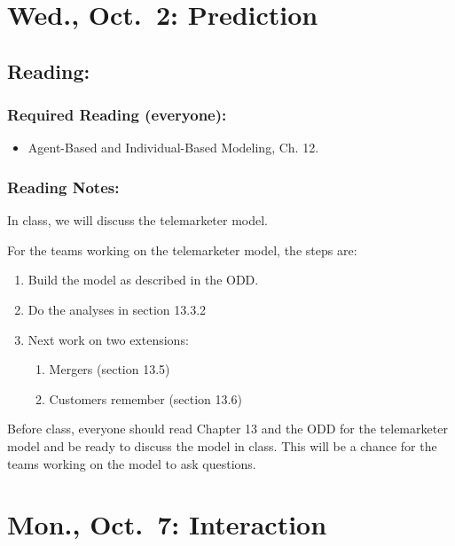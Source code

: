 \documentclass[
]{article}
\providecommand{\tightlist}{%
  \setlength{\itemsep}{0pt}\setlength{\parskip}{0pt}}
\begin{document}
\section{Wed., Oct.~2: Prediction}\label{wed.-oct.-2-prediction}

\subsection{Reading:}\label{reading-12}

\subsubsection{Required Reading
(everyone):}\label{required-reading-everyone-11}

\begin{itemize}
\tightlist
\item
  Agent-Based and Individual-Based Modeling, Ch. 12.
\end{itemize}

\subsubsection{Reading Notes:}\label{reading-notes-11}

In class, we will discuss the telemarketer model.

For the teams working on the telemarketer model, the steps are:

\begin{enumerate}
\def\labelenumi{\arabic{enumi}.}
\tightlist
\item
  Build the model as described in the ODD.
\item
  Do the analyses in section 13.3.2
\item
  Next work on two extensions:

  \begin{enumerate}
  \def\labelenumii{\arabic{enumii}.}
  \tightlist
  \item
    Mergers (section 13.5)
  \item
    Customers remember (section 13.6)
  \end{enumerate}
\end{enumerate}

Before class, everyone should read Chapter 13 and the ODD for the
telemarketer model and be ready to discuss the model in class. This will
be a chance for the teams working on the model to ask questions.

\section{Mon., Oct.~7: Interaction}\label{mon.-oct.-7-interaction}
\end{document}
